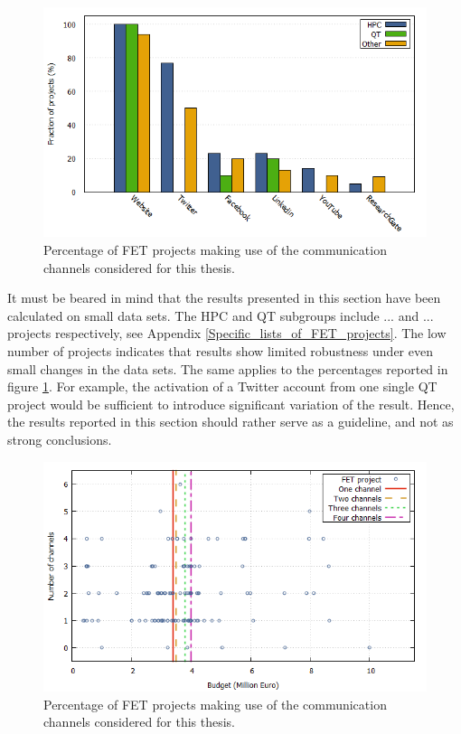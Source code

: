 \begin{figure}[!t] 
 \begin{center}
 \includegraphics[scale=0.4]{Images/Social_media_breakdown.png}
 \caption{Percentage of FET projects making use of the communication channels considered for this thesis.}
 \label{Social_media_breakdown}
 \end{center}
\end{figure}

It must be beared in mind that the results presented in this section have been calculated on small data sets. The HPC and QT subgroups include ... and ... projects respectively, see Appendix \ref{Specific_lists_of_FET_projects}. The low number of projects indicates that results show limited robustness under even small changes in the data sets. The same applies to the percentages reported in figure \ref{Social_media_breakdown}. For example, the activation of a Twitter account from one single QT project would be sufficient to introduce significant variation of the result. Hence, the results reported in this section should rather serve as a guideline, and not as strong conclusions. 


\begin{figure}[!t] 
 \begin{center}
 \includegraphics[scale=0.4]{Images/Channel_budget.png}
 \caption{Percentage of FET projects making use of the communication channels considered for this thesis.}
 \label{Channel_budget}
 \end{center}
\end{figure}

